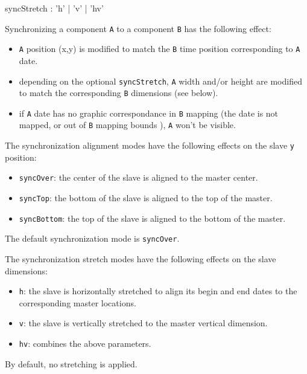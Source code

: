 \documentclass[a4paper,twoside]{report}
\newcommand{\OSC}[1]		{\texttt{#1}}
\newcommand{\values}[1]	{\texttt{#1}}
\begin{document}
\begin{rail}
syncStretch : 'h' | 'v' | 'hv'
\end{rail}

Synchronizing a component \values{A} to a component \values{B} has the following effect:
\begin{itemize}
\item \values{A} position (x,y) is modified to match the \values{B} time position corresponding to \values{A} date.
\item depending on the optional \OSC{syncStretch}, \values{A} width and/or height are modified to match the  corresponding \values{B} dimensions (see below).
\item if \values{A} date has no graphic correspondance in \values{B} mapping (the date is not mapped, or out of \values{B} mapping bounds ), \values{A} won't be visible.
\end{itemize}

The synchronization alignment modes have the following effects on the slave \values{y} position:
\begin{itemize}
\item \OSC{syncOver}: the center of the slave is aligned to the master center.
\item \OSC{syncTop}: the bottom of the slave is aligned to the top of the master.
\item \OSC{syncBottom}: the top of the slave is aligned to the bottom of the master.
\end{itemize}

The default synchronization mode is \OSC{syncOver}.

The synchronization stretch modes have the following effects on the slave dimensions:
\begin{itemize}
\item \OSC{h}: the slave is horizontally stretched to align its begin and end dates to the corresponding master locations.
\item \OSC{v}: the slave is vertically stretched to the master vertical dimension.
\item \OSC{hv}: combines the above parameters.
\end{itemize}
By default, no stretching is applied.
\end{document}
